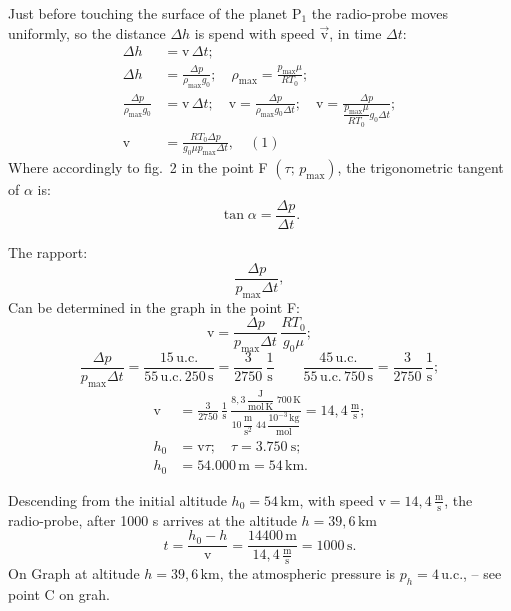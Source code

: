 \begin{description}
Just before touching the surface of the planet P$_1$ the radio-probe moves uniformly, so the
distance $\Delta h$ is spend with speed $\vec{\mathrm{v}}$, in time $\Delta t$: %
\begin{align*}
\Delta h &= \mathrm{v}\,\Delta t;\\
\Delta h &= \frac{\Delta p}{\rho_{\max}g_0};\quad
\rho_{\max} = \frac{p_{\max}\mu}{RT_0};\\
\frac{\Delta p}{\rho_{\max}g_0} &= \mathrm{v}\,\Delta t;\quad
\mathrm{v} = \frac{\Delta p}{\rho_{\max}g_0\Delta t};\quad
\mathrm{v} = \frac{\Delta p}{\dfrac{p_{\max}\mu}{RT_0}g_0\Delta t};\\
\mathrm{v} &= \frac{RT_0\Delta p}{g_0\mu p_{\max}\Delta t},\quad(1)
\end{align*}
Where accordingly to fig.~2 in the point F $(\tau;\,p_{\max})$, the trigonometric tangent of
$\alpha$ is:
\[
\tan\alpha = \frac{\Delta p}{\Delta t}.
\]

The rapport: %
\[
\frac{\Delta p}{p_{\max}\Delta t},
\]
Can be determined in the graph in the point F:
\[
\mathrm{v} = \frac{\Delta p}{p_{\max}\Delta t}\,\frac{RT_0}{g_0\mu};
\]
\[
\frac{\Delta p}{p_{\max}\Delta t}
= \frac{15\,\mathrm{u.c.}}{55\,\mathrm{u.c.}\,250\,\mathrm{s}}
= \frac{3}{2750}\,\frac{1}{\mathrm{s}}
\qquad
\frac{45\,\mathrm{u.c.}}{55\,\mathrm{u.c.}\,750\,\mathrm{s}}
= \frac{3}{2750}\,\frac{1}{\mathrm{s}};
\]
\begin{align*}
\mathrm{v} &= \frac{3}{2750}\,\frac{1}{\mathrm{s}}\,
\frac{8{,}3\,\dfrac{\mathrm{J}}{\mathrm{mol\,K}}\;700\,\mathrm{K}}
     {10\,\dfrac{\mathrm{m}}{\mathrm{s}^2}\;44\,\dfrac{10^{-3}\,\mathrm{kg}}{\mathrm{mol}}}
= 14{,}4\,\frac{\mathrm{m}}{\mathrm{s}};\\
h_0 &= \mathrm{v}\tau;\quad \tau = 3.750\ \mathrm{s};\\
h_0 &= 54.000\,\mathrm{m} = 54\,\mathrm{km}.
\end{align*}

\item[b)]
Descending from the initial altitude $h_0 = 54\,\mathrm{km}$, with speed
$\mathrm{v} = 14{,}4\,\frac{\mathrm{m}}{\mathrm{s}}$, the radio-probe, after 1000 s arrives
at the altitude $h = 39{,}6\,\mathrm{km}$
\[
t = \frac{h_0 - h}{\mathrm{v}} = \frac{14400\,\mathrm{m}}{14{,}4\,\frac{\mathrm{m}}{\mathrm{s}}}
= 1000\,\mathrm{s}.
\]
On Graph at altitude $h = 39{,}6\,\mathrm{km}$, the atmospheric pressure is
$p_h = 4\,\mathrm{u.c.}$, -- see point C on grah. %


\end{description}
